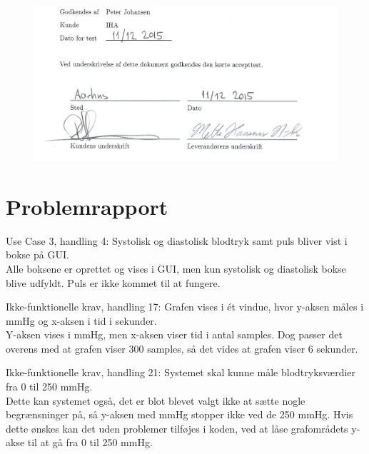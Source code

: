 
\begin{figure}[H]
	\centering
	\includegraphics[width=1.0\textwidth]{Figurer/UnderskriftAT}
\end{figure}



\newpage
\section{Problemrapport}
Use Case 3, handling 4: Systolisk og diastolisk blodtryk samt puls bliver vist i bokse på GUI. \\ 
Alle boksene er oprettet og vises i GUI, men kun systolisk og diastolisk bokse blive udfyldt. Puls er ikke kommet til at fungere. 

Ikke-funktionelle krav, handling 17: Grafen vises i ét vindue, hvor y-aksen måles i mmHg og x-aksen i tid i sekunder.\\
Y-aksen vises i mmHg, men x-aksen viser tid i antal samples. Dog passer det overens med at grafen viser 300 samples, så det vides at grafen viser 6 sekunder.  

Ikke-funktionelle krav, handling 21: Systemet skal kunne måle blodtryksværdier fra 0 til 250 mmHg. \\
Dette kan systemet også, det er blot blevet valgt ikke at sætte nogle begrænsninger på, så y-aksen med mmHg stopper ikke ved de 250 mmHg. Hvis dette ønskes kan det uden problemer tilføjes i koden, ved at låse grafområdets y-akse til at gå fra 0 til 250 mmHg.  